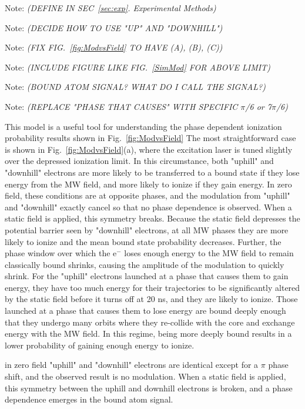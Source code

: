 \documentclass[aps,pra,preprint,groupedaddress]{revtex4-1}
\begin{document}
Note: \emph{(DEFINE IN SEC~\ref{sec:exp}. Experimental Methods)}

Note: \emph{(DECIDE HOW TO USE "UP" AND "DOWNHILL")}

Note: \emph{(FIX FIG.~\ref{fig:ModvsField} TO HAVE (A), (B), (C))}

Note: \emph{(INCLUDE FIGURE LIKE FIG.~\ref{SimMod} FOR ABOVE LIMIT)}

Note: \emph{(BOUND ATOM SIGNAL? WHAT DO I CALL THE SIGNAL?)}

Note: \emph{(REPLACE "PHASE THAT CAUSES" WITH SPECIFIC $\pi$/6 or 7$\pi$/6)}

This model is a useful tool for understanding the phase dependent ionization probability results shown in Fig.~\ref{fig:ModvsField} The most straightforward case is shown in Fig.~\ref{fig:ModvsField}(a), where the excitation laser is tuned slightly over the depressed ionization limit. In this circumstance, both "uphill" and "downhill" electrons are more likely to be transferred to a bound state if they lose energy from the MW field, and more likely to ionize if they gain energy. In zero field, these conditions are at opposite phases, and the modulation from "uphill" and "downhill" exactly cancel so that no phase dependence is observed. When a static field is applied, this symmetry breaks. Because the static field depresses the potential barrier seen by "downhill" electrons, at all MW phases they are more likely to ionize and the mean bound state probability decreases. Further, the phase window over which the e$^-$ loses enough energy to the MW field to remain classically bound shrinks, causing the amplitude of the modulation to quickly shrink. For the "uphill" electrons launched at a phase that causes them to gain energy, they have too much energy for their trajectories to be significantly altered by the static field before it turns off at 20 ns, and they are likely to ionize. Those launched at a phase that causes them to lose energy are bound deeply enough that they undergo many orbits where they re-collide with the core and exchange energy with the MW field. In this regime, being more deeply bound results in a lower probability of gaining enough energy to ionize.

in zero field "uphill" and "downhill" electrons are identical except for a $\pi$ phase shift, and the observed result is no modulation. When a static field is applied, this symmetry between the uphill and downhill electrons is broken, and a phase dependence emerges in the bound atom signal. 
\end{document}
